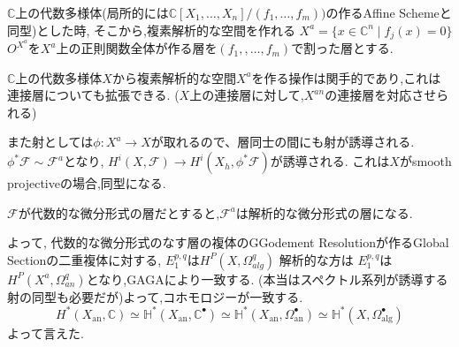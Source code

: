 $\mathbb{C}$上の代数多様体(局所的には$\mathbb{C}[X_1,\dots,X_n]/(f_1, \ldots, f_m))$の作るAffine Schemeと同型)とした時,
そこから,複素解析的な空間を作れる
$X^a= \{ x \in \mathbb{C}^n \mid f_j(x) = 0 \}$
$O^{X^{a}}$を$X^a$上の正則関数全体が作る層を$(f_1,, \ldots, f_m)$で割った層とする.

$\mathbb{C}$上の代数多様体$X$から複素解析的な空間$X^a$を作る操作は関手的であり,これは連接層についても拡張できる.
($X$上の連接層に対して,$X^{an}$の連接層を対応させられる)

また射としては$\phi: X^{a} \to X$が取れるので、層同士の間にも射が誘導される.
$\phi^* \mathcal{F} \sim \mathcal{F}^a$となり,
$H^i(X, \mathcal{F}) \to H^i(X_h, \phi^* \mathcal{F})$が誘導される.
これは$X$がsmooth projectiveの場合,同型になる.

$\mathcal{F}$が代数的な微分形式の層だとすると,$\mathcal{F}^a$は解析的な微分形式の層になる.

よって,
代数的な微分形式のなす層の複体のGGodement Resolutionが作るGlobal Sectionの二重複体に対する,
$E_1^{p,q}$は$H^P(X, \Omega_{alg}^q)$
解析的な方は
$E_1^{p,q}$は$H^P(X^a, \Omega_{an}^q)$となり,GAGAにより一致する.
(本当はスペクトル系列が誘導する射の同型も必要だが)よって,コホモロジーが一致する.
$$
H^{*}\left(X_{\mathrm{an}}, \mathbb{\mathbb { C }}\right) \simeq
\mathbb{H}^{*}\left(X_{\mathrm{an}}, \mathbb{C}^{\bullet}\right) \simeq
\mathbb{H}^{*}\left(X_{\mathrm{an}}, \Omega_{\mathrm{an}}^{\bullet}\right) \simeq
\mathbb{H}^{*} \left(X, \Omega_{\mathrm{alg}}^{\bullet}\right)
$$
よって言えた.